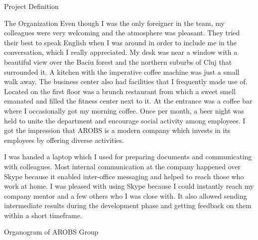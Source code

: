 \documentclass{matthijs}
\begin{document}
\begin{hoofdstuk}{Project Definition}
\begin{paragraaf}{The Organization}
			Even though I was the only foreigner in the team, my colleagues were very welcoming and the atmosphere was pleasant.
			They tried their best to speak English when I was around in order to include me in the conversation, which I really appreciated.
			My desk was near a window with a beautiful view over the Baciu forest and the northern suburbs of Cluj that surrounded it.
			A kitchen with the imperative coffee machine was just a small walk away.
			The business center also had facilities that I frequently made use of.
			Located on the first floor was a brunch restaurant from which a sweet smell emanated and filled the fitness center next to it.
			At the entrance was a coffee bar where I occasionally got my morning coffee.
			Once per month, a beer night was held to unite the department and encourage social activity among employees.
			I got the impression that AROBS is a modern company which invests in its employees by offering diverse activities.

			\noindent I was handed a laptop which I used for preparing documents and communicating with colleagues.
			Most internal communication at the company happened over Skype because it enabled inter-office messaging and helped to reach those who work at home.
			I was pleased with using Skype because I could instantly reach my company mentor and a few others who I was close with.
			It also allowed sending intermediate results during the development phase and getting feedback on them within a short timeframe.

			\vspace{1ex}
			\begin{figuur}{Organogram of AROBS Group}
				\centerline{
					}
\end{figuur}
\end{paragraaf}
\end{hoofdstuk}
\end{document}
